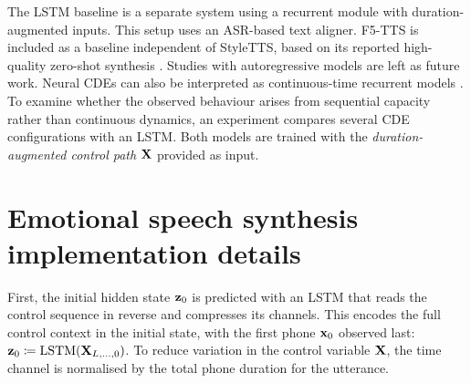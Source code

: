 The \ac{LSTM} baseline is a separate system using a recurrent module with duration-augmented inputs. This setup uses an ASR-based text aligner. F5-TTS is included as a baseline independent of StyleTTS, based on its reported high-quality zero-shot synthesis \citep{chen-etal-2024-f5tts}. Studies with autoregressive models are left as future work. Neural \acp{CDE} can also be interpreted as continuous-time recurrent models \citep{kidger2020neuralcde}. To examine whether the observed behaviour arises from sequential capacity rather than continuous dynamics, an experiment compares several \ac{CDE} configurations with an \ac{LSTM}. Both models are trained with the \textit{duration-augmented control path} ${\mathbf{X}}$ provided as input.



\section{Emotional speech synthesis implementation details}
First, the initial hidden state ${\mathbf{z}}_0$ is predicted with an \ac{LSTM} that reads the control sequence in reverse and compresses its channels. This encodes the full control context in the initial state, with the first phone ${\mathbf{x}}_0$ observed last: ${\mathbf{z}}_0\coloneqq \textnormal{LSTM}({\mathbf{X}}_{L,\dots,0})$. To reduce variation in the control variable ${\mathbf{X}}$, the time channel is normalised by the total phone duration for the utterance.

